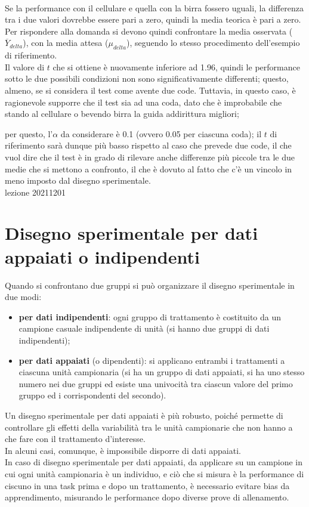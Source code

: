 \documentclass[10pt, draft]{book}
\begin{document}
\\
Se la performance con il cellulare e quella con la birra fossero uguali, la differenza tra i due valori dovrebbe essere pari a zero, quindi la media teorica è pari a zero.
\\
Per rispondere alla domanda si devono quindi confrontare la media osservata ($\overline{Y}_{delta}$), con la media attesa ($\mu_{delta}$), seguendo lo stesso procedimento dell'esempio di riferimento.
\\
Il valore di $t$ che si ottiene è nuovamente inferiore ad 1.96, quindi le performance sotto le due possibili condizioni non sono significativamente differenti; questo, almeno, se si considera il test come avente due code. Tuttavia, in questo caso, è ragionevole supporre che il test sia ad una coda, dato che è improbabile che stando al cellulare o bevendo birra la guida addirittura migliori; \colorbox{lyellow}{\parbox{0.98\textwidth}{per questo, l'$\alpha$ da considerare è 0.1 (ovvero 0.05 per ciascuna coda); il $t$ di riferimento sarà dunque più basso rispetto al caso che prevede due code, il che vuol dire che il test è in grado di rilevare anche differenze più piccole tra le due medie che si mettono a confronto, il che è dovuto al fatto che c'è un vincolo in meno imposto dal disegno sperimentale.
\\
lezione 20211201}}

\section{Disegno sperimentale per dati appaiati o indipendenti}

Quando si confrontano due gruppi si può organizzare il disegno sperimentale in due modi:
\begin{itemize}
    \item \textbf{per dati indipendenti}: ogni gruppo di trattamento è costituito da un campione casuale indipendente di unità (si hanno due gruppi di dati indipendenti);
    \item \textbf{per dati appaiati} (o dipendenti): si applicano entrambi i trattamenti a ciascuna unità campionaria (si ha un gruppo di dati appaiati, si ha uno stesso numero nei due gruppi ed esiste una univocità tra ciascun valore del primo gruppo ed i corrispondenti del secondo).
\end{itemize}
Un disegno sperimentale per dati appaiati è più robusto, poiché permette di controllare gli effetti della variabilità tra le unità campionarie che non hanno a che fare con il trattamento d'interesse.
\\
In alcuni casi, comunque, è impossibile disporre di dati appaiati.
\\
In caso di disegno sperimentale per dati appaiati, da applicare su un campione in cui ogni unità campionaria è un individuo, e ciò che si misura è la performance di ciscuno in una task prima e dopo un trattamento, è necessario evitare bias da apprendimento, misurando le performance dopo diverse prove di allenamento.
\end{document}
